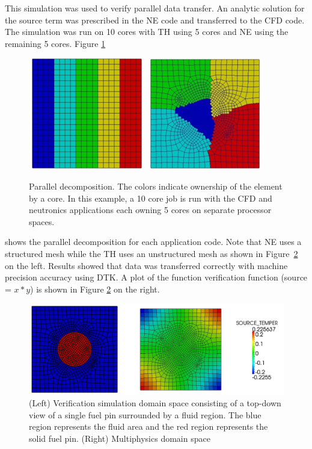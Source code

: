 \documentclass{mc2013}
\begin{document}
This simulation was used to verify parallel data transfer.  An
analytic solution for the source term was prescribed in the NE code
and transferred to the CFD code.   The
simulation was run on 10 cores with TH using 5 cores and NE using the
remaining 5 cores.  Figure \ref{fig:parallel_decomposition}
\begin{figure}[ht!]
  \centering
  \includegraphics[width=2.0in]{neutronics_parallel_decomp.png}
  \includegraphics[width=2.0in]{cfd_parallel_decomp.png}
  \caption{Parallel decomposition.  The colors indicate ownership of
    the element by a core.  In this example, a 10 core job is run with
    the CFD and neutronics applications each owning 5 cores on
    separate processor spaces.}
  \label{fig:parallel_decomposition}
\end{figure}
 shows the parallel decomposition for each application code.  Note
 that NE uses a structured mesh while the TH uses an unstructured mesh
 as shown in Figure~\ref{fig:domain} on the left. Results showed that
 data was transferred correctly with machine precision accuracy using
 DTK.  A plot of the function verification function (source = $x*y$)
 is shown in Figure \ref{fig:domain} on the right.
\begin{figure}[ht!]
  \centering \includegraphics[width=6.0in]{cht_results.png}
  \caption{(Left) Verification simulation domain space consisting of a
    top-down view of a single fuel pin surrounded by a fluid
    region. The blue region represents the fluid area and the red
    region represents the solid fuel pin. (Right) Multiphysics domain
    space}
  \label{fig:domain}
\end{figure}
\end{document}
